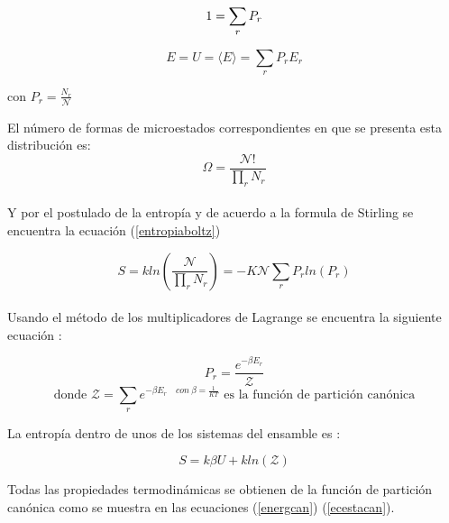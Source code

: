 \begin{equation} \label{restrprob}
    1 = \sum_r P_r \\
\end{equation}

\begin{equation} \label{energiaprob}
    E = U = \langle E\rangle = \sum_r P_r E_r
\end{equation}

\begin{center}
    con $P_r = \frac{N_r}{\mathcal{N}}$
\end{center}


El número de formas de microestados correspondientes en que se presenta esta distribución es:\\

\begin{equation} \label{ditrbmicro}
    \Omega = \frac{\mathcal{N}!}{\prod_r N_r}
\end{equation}\\

Y por el postulado de la entropía y de acuerdo a la formula de Stirling se encuentra la ecuación (\ref{entropiaboltz})

\begin{equation}  \label{entropiaboltz}
    S = kln(\frac{\mathcal{N}}{\prod_r N_r}) = -K\mathcal{N}\sum_r P_rln(P_r)
\end{equation}\\

Usando el método de los multiplicadores de Lagrange se encuentra la siguiente ecuación \cite{greiner1995}:

\begin{equation} \label{probcan}
    P_r = \frac{e^{-\beta E_r}}{\mathcal{Z}}
\end{equation}
\begin{equation*} \label{funcpartcan}
    \text{donde }\mathcal{Z} = \sum_r e^{-\beta E_r \quad con\ \beta=\frac{1}{KT}} \text{ es la función de partición canónica}
\end{equation*}

La entropía dentro de unos de los sistemas del ensamble es \cite{mandl1988statistical}:

\begin{equation} \label{entrnvt}
    S = k\beta U + kln(\mathcal{Z})
\end{equation}

Todas las propiedades termodinámicas se obtienen de la función de partición canónica como se muestra en las ecuaciones (\ref{energcan}) (\ref{ecestacan}).


